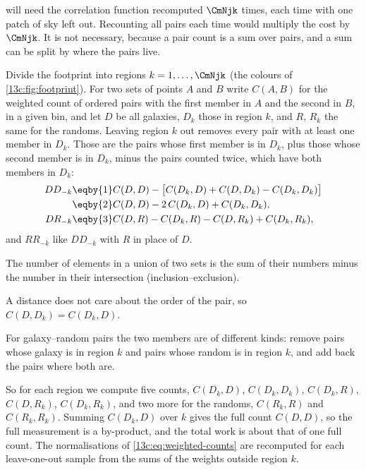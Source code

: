  will need the correlation function recomputed $\CmNjk$
times, each time with one patch of sky left out. Recounting all pairs each time
would multiply the cost by $\CmNjk$. It is not necessary, because a pair count is a
sum over pairs, and a sum can be split by where the pairs live.

Divide the footprint into regions $k=1,\dots,\CmNjk$ (the colours of
\cref{13c:fig:footprint}). For two sets of points $A$ and $B$ write $C(A,B)$ for the
weighted count of ordered pairs with the first member in $A$ and the second in $B$,
in a given bin, and let $D$ be all galaxies, $D_k$ those in region $k$, and
$R$, $R_k$ the same for the randoms. Leaving region $k$ out removes every pair with
at least one member in $D_k$. Those are the pairs whose first member is in $D_k$, plus
those whose second member is in $D_k$, minus the pairs counted twice, which have both
members in $D_k$:
\begin{align}
  DD_{-k}
  &\eqby{1}C(D,D)-\bigl[C(D_k,D)+C(D,D_k)-C(D_k,D_k)\bigr]\nonumber\\
  &\eqby{2}C(D,D)-2\,C(D_k,D)+C(D_k,D_k),
  \label{13c:eq:dd-minus-k}\\
  DR_{-k}
  &\eqby{3}C(D,R)-C(D_k,R)-C(D,R_k)+C(D_k,R_k),
  \label{13c:eq:dr-minus-k}
\end{align}
and $RR_{-k}$ like $DD_{-k}$ with $R$ in place of $D$.
\begin{explain}
  \item The number of elements in a union of two sets is the sum of their numbers
        minus the number in their intersection (inclusion--exclusion).
  \item A distance does not care about the order of the pair, so
        $C(D,D_k)=C(D_k,D)$.
  \item For galaxy--random pairs the two members are of different kinds: remove
        pairs whose galaxy is in region $k$ and pairs whose random is in region $k$,
        and add back the pairs where both are.
\end{explain}
So for each region we compute five counts, $C(D_k,D)$, $C(D_k,D_k)$, $C(D_k,R)$,
$C(D,R_k)$, $C(D_k,R_k)$, and two more for the randoms, $C(R_k,R)$ and $C(R_k,R_k)$.
Summing $C(D_k,D)$ over $k$ gives the full count $C(D,D)$, so the full measurement
is a by-product, and the total work is about that of one full count. The
normalisations of \eqref{13c:eq:weighted-counts} are recomputed for each
leave-one-out sample from the sums of the weights outside region $k$.

